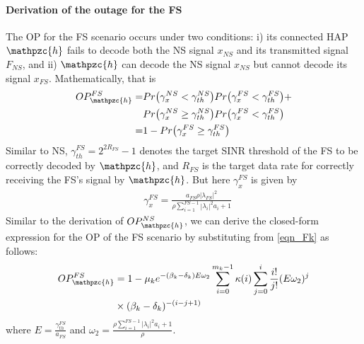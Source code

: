 \documentclass[letter,journal]{IEEEtran}
\begin{document}
\paragraph{\bf Derivation of the outage for the FS} The OP for the FS scenario occurs under two conditions: i) its connected HAP $\mathpzc{h}$ fails to decode both the NS signal $x_{NS}$ and its transmitted signal $F_{NS}$, and ii) $\mathpzc{h}$ can decode the NS signal $x_{NS}$ but cannot decode its signal $x_{FS}$. Mathematically, that is 
\begin{align}\label{OP_F}
   OP_{\mathpzc {h}}^{FS}=&Pr\bigl(\gamma_{x}^{NS}<\gamma_{th}^{NS} \bigl)  Pr\bigl(\gamma_{x}^{FS}<\gamma_{th}^{FS} \bigl) +  \nonumber\\& Pr\bigl(\gamma_{x}^{NS}\geq\gamma_{th}^{NS}\bigl)Pr\bigl(\gamma_{x}^{FS}<\gamma_{th}^{FS} \bigl)\nonumber\\
        =&1-Pr\bigl(\gamma_{x}^{FS}\geq\gamma_{th}^{FS}\bigl) 
\end{align}
Similar to NS,  $\gamma_{th}^{FS}=2^{2R_{FS}}-1$  denotes the target SINR threshold of the FS to be correctly decoded by $\mathpzc {h}$, and $R_{FS}$ is the target data rate for correctly receiving the FS's signal by $\mathpzc {h}$. But here  $\gamma_{x}^{FS}$ is given by
\begin{equation}\label{OP_N_F}
\begin{aligned} 
    &\gamma_{x}^{FS}=\frac{a_{FS}\rho|\lambda_{FS}|^2}{\rho \sum_{i=1}^{FS-1}|\lambda_{i}|^2 a_{i}+1}
\end{aligned}
\end{equation}
Similar to the derivation of $OP_{\mathpzc {h}}^{NS}$, we can derive the closed-form expression for the OP of the FS scenario by substituting from \eqref{eqn_Fk} as follows:\vspace{-0.2cm}
\begin{align}\label{OP_FS}
        OP_{\mathpzc {h}}^{FS}&=1-\mu_k  e^{-(\beta_k-\delta_k)E\omega_2} \sum_{i=0}^{m_k-1} \kappa(i)\sum_{j=0}^i \frac{i!}{j!} (E \omega_2)^j \nonumber\\& \times(\beta_k-\delta_k )^{-(i-j+1)}
\end{align}
where $E=\frac{\gamma_{th}^{FS}}{a_{FS}}$ and $\omega_2=\frac{\rho \sum_{i=1}^{FS-1}|\lambda_{i}|^2 a_{i}+1}{\rho}$.\vspace{1mm}
\end{document}
